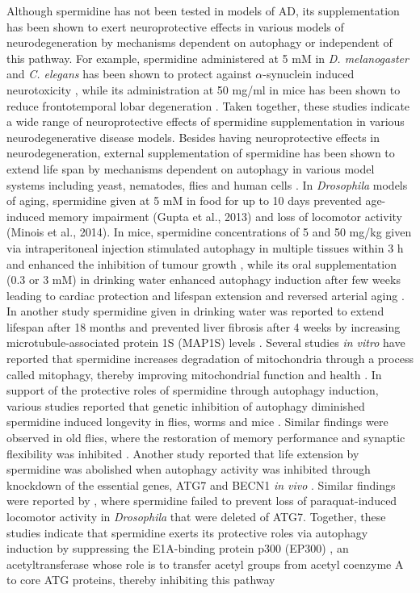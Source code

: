 Although spermidine has not been tested in models of AD, its supplementation has been shown to exert neuroprotective effects in various models of neurodegeneration  by mechanisms dependent on autophagy or independent of this pathway. For example, spermidine administered at 5 mM in \textit{D. melanogaster}  and \textit{C. elegans} has been shown to protect against $\alpha$-synuclein induced neurotoxicity \citep{Buttner2014}, while its administration at  50 mg/ml in mice has been shown to reduce frontotemporal lobar degeneration \citep{Wang2012}. Taken together, these studies indicate a wide range of neuroprotective effects of spermidine supplementation in various neurodegenerative disease models. Besides having neuroprotective effects in neurodegeneration, external supplementation of spermidine has been shown to extend life span by mechanisms dependent on autophagy in various model systems including yeast, nematodes, flies \citep{Eisenberg2009,Minois2012,Morselli2011} and human cells \citep{Eisenberg2009,Garcia-Prat2016,Morselli2011,Pietrocola2015}. In \textit{Drosophila} models of aging, spermidine given at 5 mM in food for up to 10 days prevented age-induced memory impairment (Gupta et al., 2013) and loss of locomotor activity (Minois et al., 2014). In mice, spermidine concentrations of 5 and 50 mg/kg given via intraperitoneal injection stimulated autophagy in multiple tissues within 3 h \citep{Morselli2011,Pucciarelli2012} and enhanced the inhibition of tumour growth \citep{Pietrocola2016}, while its oral supplementation (0.3 or  3 mM) in drinking water enhanced autophagy induction after few weeks leading to cardiac protection and lifespan extension \citep{Eisenberg2016a} and reversed arterial aging \citep{LaRocca2013}. In another study spermidine given in drinking water was reported to extend lifespan after 18 months and prevented liver fibrosis after 4 weeks by increasing microtubule-associated protein 1S (MAP1S) levels \citep{Yue2017}. Several studies \textit{in vitro} have reported that spermidine increases degradation of mitochondria through a process called mitophagy, thereby improving mitochondrial function and health \citep{Eisenberg2016a,Fan2017,Garcia-Prat2016,Qi2016}. In support of the protective roles of spermidine through autophagy induction, various studies reported that genetic inhibition of autophagy diminished spermidine induced longevity in flies, worms \citep{Eisenberg2009} and mice \citep{Yue2017}. Similar findings were observed in old flies, where the restoration of memory performance and synaptic flexibility was inhibited \citep{Gupta2013,Gupta2016}. Another study reported that life extension by spermidine was abolished when autophagy activity was inhibited through knockdown of the essential genes, ATG7 and BECN1 \textit{in vivo} \citep{He2013}. Similar findings were reported by \citet{Minois2012}, where spermidine failed to prevent loss of paraquat-induced locomotor activity in \textit{Drosophila} that were deleted of ATG7. Together, these studies indicate that spermidine exerts its protective roles via autophagy induction by suppressing the E1A-binding protein p300 (EP300) \citep{Pietrocola2015}, an acetyltransferase whose role is to transfer acetyl groups from acetyl coenzyme A to core ATG proteins, thereby inhibiting this pathway 